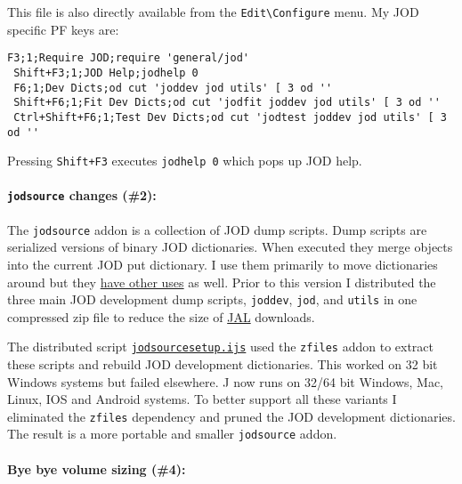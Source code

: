 \noindent This file is also directly available from the
\texttt{Edit\textbackslash{}Configure} menu. My JOD specific PF keys
are:

\begin{tcolorbox}[breakable, size=fbox, boxrule=1pt, pad at break*=1mm,colback=cellbackground, colframe=cellborder]
\begin{lstlisting}[language=jdoc, frame=single,framerule=0pt,label=lst:scr4946X1]
 F3;1;Require JOD;require 'general/jod' 
 Shift+F3;1;JOD Help;jodhelp 0 
 F6;1;Dev Dicts;od cut 'joddev jod utils' [ 3 od '' 
 Shift+F6;1;Fit Dev Dicts;od cut 'jodfit joddev jod utils' [ 3 od '' 
 Ctrl+Shift+F6;1;Test Dev Dicts;od cut 'jodtest joddev jod utils' [ 3 od '' 
\end{lstlisting}
\end{tcolorbox}

\noindent Pressing \texttt{Shift+F3} executes \texttt{jodhelp\ 0} which pops up
JOD help.

\paragraph{\texorpdfstring{\texttt{jodsource} changes
(\#2)}{jodsource changes (\#2)}:}

The \texttt{jodsource} addon is a collection of JOD dump scripts. Dump
scripts are serialized versions of binary JOD dictionaries. When
executed they merge objects into the current JOD put dictionary. I use
them primarily to move dictionaries around but they
\href{https://github.com/bakerjd99/joddumps}{have other uses} as well.
Prior to this version I distributed the three main JOD development dump
scripts, \texttt{joddev}, \texttt{jod}, and \texttt{utils} in one
compressed zip file to reduce the size of
\href{http://www.jsoftware.com/jwiki/JAL}{JAL} downloads.

The distributed script
\href{https://github.com/bakerjd99/jod/blob/master/jodsource/jodsourcesetup.ijs}{\texttt{jodsourcesetup.ijs}}
used the \texttt{zfiles} addon to extract these scripts and rebuild JOD
development dictionaries. This worked on 32 bit Windows systems but
failed elsewhere. J now runs on 32/64 bit Windows, Mac, Linux, IOS and
Android systems. To better support all these variants I eliminated the
\texttt{zfiles} dependency and pruned the JOD development dictionaries.
The result is a more portable and smaller \texttt{jodsource} addon.

\paragraph{Bye bye volume sizing (\#4):}

